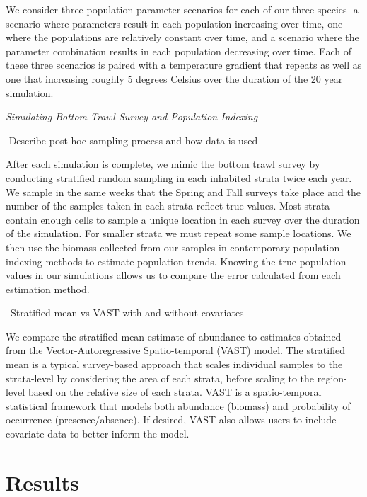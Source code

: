 \documentclass[
  12pt,
]{article}
\begin{document}
We consider three population parameter scenarios for each of our three species- a scenario where parameters result in each population increasing over time, one where the populations are relatively constant over time, and a scenario where the parameter combination results in each population decreasing over time. Each of these three scenarios is paired with a temperature gradient that repeats as well as one that increasing roughly 5 degrees Celsius over the duration of the 20 year simulation.

\emph{Simulating Bottom Trawl Survey and Population Indexing}

-Describe post hoc sampling process and how data is used

After each simulation is complete, we mimic the bottom trawl survey by conducting stratified random sampling in each inhabited strata twice each year. We sample in the same weeks that the Spring and Fall surveys take place and the number of the samples taken in each strata reflect true values. Most strata contain enough cells to sample a unique location in each survey over the duration of the simulation. For smaller strata we must repeat some sample locations. We then use the biomass collected from our samples in contemporary population indexing methods to estimate population trends. Knowing the true population values in our simulations allows us to compare the error calculated from each estimation method.

--Stratified mean vs VAST with and without covariates

We compare the stratified mean estimate of abundance to estimates obtained from the Vector-Autoregressive Spatio-temporal (VAST) model. The stratified mean is a typical survey-based approach that scales individual samples to the strata-level by considering the area of each strata, before scaling to the region-level based on the relative size of each strata. VAST is a spatio-temporal statistical framework that models both abundance (biomass) and probability of occurrence (presence/absence). If desired, VAST also allows users to include covariate data to better inform the model.

\section{Results}
\end{document}
